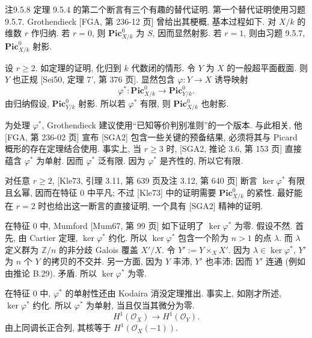 \begin{origstatement}{注}{9.5.8}\label{ch09s05:rem9.5.8}
定理 9.5.4 的第二个断言有三个有趣的替代证明. 第一个替代证明使用习题 9.5.7. Grothendieck [FGA, 第 236-12 页] 曾给出其梗概, 基本过程如下. 对 $X/k$ 的维数 $r$ 作归纳. 若 $r=0$, 则 $\mathbf{Pic}^0_{X/k}$ 为 $S$, 因而显然射影. 若 $r=1$, 则由习题 9.5.7, $\mathbf{Pic}^0_{X/k}$ 射影.

设 $r\geq2$. 如定理的证明, 化归到 $k$ 代数闭的情形. 令 $Y$ 为 $X$ 的一般超平面截面. 则 $Y$ 也正规 [Sei50, 定理 7', 第 376 页]. 显然包含 $\varphi:Y\to X$ 诱导映射
\[
 \varphi^*:\mathbf{Pic}^0_{X/k}\longrightarrow\mathbf{Pic}^0_{Y/k}.
\]
由归纳假设, $\mathbf{Pic}^0_{Y/k}$ 射影. 所以若 $\varphi^*$ 有限, 则 $\mathbf{Pic}^0_{X/k}$ 也射影.

为处理 $\varphi^*$, Grothendieck 建议使用“已知等价判别准则”的一个版本. 与此相关, 他 [FGA, 第 236-02 页] 宣布 [SGA2] 包含一些关键的预备结果, 必须将其与 Picard 概形的存在定理结合使用. 事实上, 当 $r\geq3$ 时, [SGA2, 推论 3.6, 第 153 页] 直接蕴含 $\varphi^*$ 为单射. 因而 $\varphi^*$ 泛有限. 因为 $\varphi^*$ 是齐性的, 所以它有限.

对任意 $r\geq2$, [Kle73, 引理 3.11, 第 639 页及注 3.12, 第 640 页] 断言 $\ker\varphi^*$ 有限且幺幂, 因而在特征 $0$ 中平凡; 不过 [Kle73] 中的证明需要 $\mathbf{Pic}^0_{X/k}$ 的紧性. 最好能在 $r=2$ 时也给出这一断言的直接证明, 一个具有 [SGA2] 精神的证明.

在特征 $0$ 中, Mumford [Mum67, 第 99 页] 如下证明了 $\ker\varphi^*$ 为零. 假设不然. 首先, 由 Cartier 定理, $\ker\varphi^*$ 约化. 所以 $\ker\varphi^*$ 包含一个阶为 $n>1$ 的点 $\lambda$. 而 $\lambda$ 定义群为 $\mathbb Z/n$ 的非分歧 Galois 覆盖 $X'/X$. 令 $Y':=Y\times_X X'$. 因为 $\lambda\in\ker\varphi^*$, $Y'$ 为 $n$ 个 $Y$ 的拷贝的不交并. 另一方面, 因为 $Y$ 丰沛, $Y'$ 也丰沛; 因而 $Y'$ 连通 (例如由推论 B.29). 矛盾. 所以 $\ker\varphi^*$ 为零.

在特征 $0$ 中, $\varphi^*$ 的单射性还由 Kodaira 消没定理推出. 事实上, 如刚才所述, $\ker\varphi^*$ 约化. 所以 $\varphi^*$ 为单射, 当且仅当其微分为零.
\[
 H^1(\mathcal O_X)\longrightarrow H^1(\mathcal O_Y).
\]
由上同调长正合列, 其核等于 $H^1(\mathcal O_X(-1))$.




\end{origstatement}
